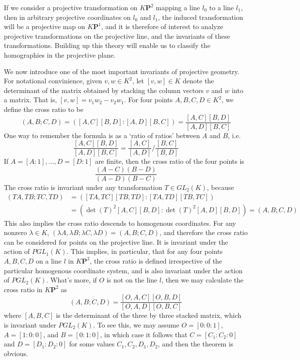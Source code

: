 If we consider a projective transformation on $K\mathbf{P}^2$ mapping a line $l_0$ to a line $l_1$, then in arbitrary projective coordinates on $l_0$ and $l_1$, the induced transformation will be a projective map on $K\mathbf{P}^1$, and it is therefore of interest to analyze projective transformations on the projective line, and the invariants of these transformations. Building up this theory will enable us to classify the homographies in the projective plane.

We now introduce one of the most important invariants of projective geometry. For notational convinience, given $v,w \in K^2$, let $[v,w] \in K$ denote the determinant of the matrix obtained by stacking the column vectors $v$ and $w$ into a matrix. That is, $[v,w] = v_1w_2 - v_2w_1$. For four points $A,B,C,D \in K^2$, we define the cross ratio to be
%
\[ (A,B;C,D) = \left( [A,C][B,D] : [A,D][B,C] \right) = \frac{[A,C][B,D]}{[A,D][B,C]} \]
%
One way to remember the formula is as a `ratio of ratios' between $A$ and $B$, i.e.
%
\[ \frac{[A,C][B,D]}{[A,D][B,C]} = \frac{[A,C]}{[A,D]} \bigg/ \frac{[B,C]}{[B,D]} \]
%
If $A = [A:1], \dots, D = [D:1]$ are finite, then the cross ratio of the four points is
%
\[ \frac{(A-C)(B-D)}{(A-D)(B-C)} \]
%
The cross ratio is invariant under any transformation $T \in GL_2(K)$, because
%
\begin{align*}
    (TA,TB;TC,TD) &= \left( [TA,TC][TB,TD] : [TA,TD][TB,TC] \right)\\
    &= (\det(T)^2 [A,C][B,D]: \det(T)^2 [A,D][B,D]) = (A,B;C,D)
\end{align*}
%
This also implies the cross ratio descends to homogenous coordinates. For any nonzero $\lambda \in K$, $(\lambda A, \lambda B; \lambda C, \lambda D) = (A,B;C,D)$, and therefore the cross ratio can be considered for points on the projective line. It is invariant under the action of $PGL_1(K)$. This implies, in particular, that for any four points $A,B,C,D$ on a line $l$ in $K\mathbf{P}^2$, the cross ratio is defined irrespective of the particular homogenous coordinate system, and is also invariant under the action of $PGL_2(K)$. What's more, if $O$ is not on the line $l$, then we may calculate the cross ratio in $K\mathbf{P}^2$ as
%
\[ (A,B;C,D) = \frac{[O,A,C][O,B,D]}{[O,A,D][O,B,C]} \]
%
where $[A,B,C]$ is the determinant of the three by three stacked matrix, which is invariant under $PGL_2(K)$. To see this, we may assume $O = [0:0:1]$, $A = [1:0:0]$, and $B = [0:1:0]$, in which case it follows that $C = [C_1:C_2:0]$ and $D = [D_1:D_2:0]$ for some values $C_1,C_2,D_1,D_2$, and then the theorem is obvious.

